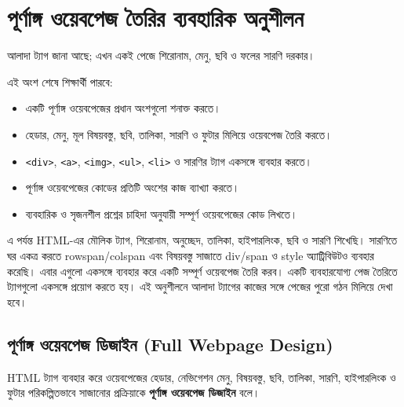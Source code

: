 \section{পূর্ণাঙ্গ ওয়েবপেজ তৈরির ব্যবহারিক অনুশীলন}

আলাদা ট্যাগ জানা আছে; এখন একই পেজে শিরোনাম, মেনু, ছবি ও ফলের সারণি দরকার।



\begin{learningbox}
এই অংশ শেষে শিক্ষার্থী পারবে:
\begin{itemize}
\item একটি পূর্ণাঙ্গ ওয়েবপেজের প্রধান অংশগুলো শনাক্ত করতে।
\item হেডার, মেনু, মূল বিষয়বস্তু, ছবি, তালিকা, সারণি ও ফুটার মিলিয়ে ওয়েবপেজ তৈরি করতে।
\item \texttt{<div>}, \texttt{<a>}, \texttt{<img>}, \texttt{<ul>}, \texttt{<li>} ও সারণির ট্যাগ একসঙ্গে ব্যবহার করতে।
\item পূর্ণাঙ্গ ওয়েবপেজের কোডের প্রতিটি অংশের কাজ ব্যাখ্যা করতে।
\item ব্যবহারিক ও সৃজনশীল প্রশ্নের চাহিদা অনুযায়ী সম্পূর্ণ ওয়েবপেজের কোড লিখতে।
\end{itemize}
\end{learningbox}

এ পর্যন্ত HTML-এর মৌলিক ট্যাগ, শিরোনাম, অনুচ্ছেদ, তালিকা, হাইপারলিংক, ছবি ও সারণি শিখেছি। সারণিতে ঘর একত্র করতে rowspan/colspan এবং বিষয়বস্তু সাজাতে div/span ও style অ্যাট্রিবিউটও ব্যবহার করেছি। এবার এগুলো একসঙ্গে ব্যবহার করে একটি সম্পূর্ণ ওয়েবপেজ তৈরি করব। একটি ব্যবহারযোগ্য পেজ তৈরিতে ট্যাগগুলো একসঙ্গে প্রয়োগ করতে হয়। এই অনুশীলনে আলাদা ট্যাগের কাজের সঙ্গে পেজের পুরো গঠন মিলিয়ে দেখা হবে।

\subsection{পূর্ণাঙ্গ ওয়েবপেজ ডিজাইন (Full Webpage Design)}

\begin{definitionbox}{}
HTML ট্যাগ ব্যবহার করে ওয়েবপেজের হেডার, নেভিগেশন মেনু, বিষয়বস্তু, ছবি, তালিকা, সারণি, হাইপারলিংক ও ফুটার পরিকল্পিতভাবে সাজানোর প্রক্রিয়াকে \textbf{পূর্ণাঙ্গ ওয়েবপেজ ডিজাইন} বলে।
\end{definitionbox}

